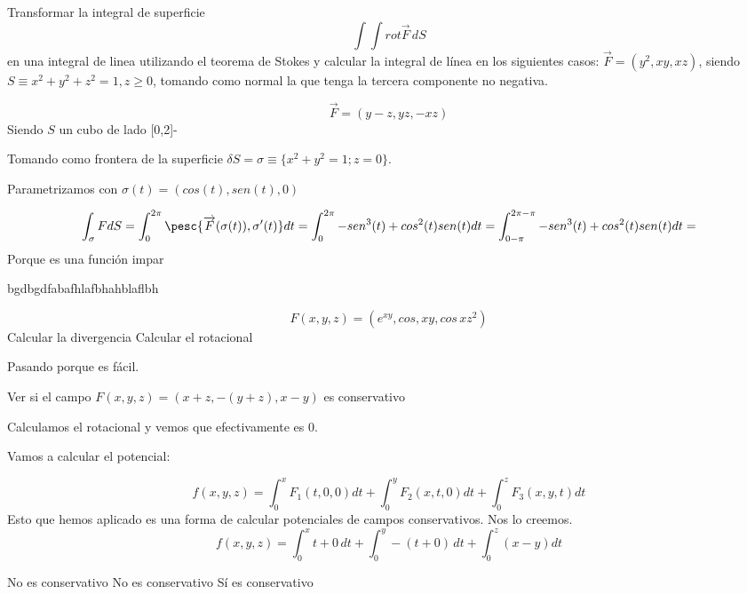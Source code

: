 \begin{problem}[20]
Transformar la integral de superficie \[\int\int rot\overrightarrow{F}\,dS\]
en una integral de linea utilizando el teorema de Stokes y calcular la integral de línea en los siguientes casos:
\ppart
$\overrightarrow{F} = (y^2,xy,xz)$, siendo $S \equiv x^2+y^2+z^2=1, z\geq 0$, tomando como normal la que tenga la tercera componente no negativa.

\ppart
 \[\overrightarrow{F} = (y-z,yz,-xz)\]
 Siendo $S$ un cubo de lado [0,2]-
\solution

\spart
Tomando como frontera de la superficie $\delta S = \sigma \equiv\{ x^2+y^2=1; z=0\}$.

Parametrizamos con $\sigma(t) = (cos(t),sen(t),0)$

\[
\int_{\sigma} FdS = \int_0^{2\pi}
\pesc{ \overrightarrow{F}(\sigma(t)), \sigma'(t)} dt = \int_0^{2\pi} -sen^3(t) + cos^2(t)sen(t) dt = \int_{0-\pi}^{2\pi-\pi} -sen^3(t) + cos^2(t)sen(t) dt = 
\]
Porque es una función impar

\spart

bgdbgdfabafhlafbhahblaflbh

\end{problem}



\begin{problem}[18]
\[F(x,y,z) = \left(e^{xy},cos
,xy,cos\,xz^2\right)\]
\ppart Calcular la divergencia
\ppart Calcular el rotacional
\solution

Pasando porque es fácil.

\end{problem}

\begin{problem}[19]

\ppart Ver si el campo  $ F(x,y,z) = (x+z,-(y+z),x-y)$ es conservativo
\ppart 
\ppart
\ppart 

\solution

\spart Calculamos el rotacional y vemos que efectivamente es 0.

Vamos a calcular el potencial:

\[f(x,y,z) = \int_0^x F_1(t,0,0)dt + \int_0^y F_2(x,t,0)dt + \int_0^z F_3(x,y,t)dt \]
Esto que hemos aplicado es una forma de calcular potenciales de campos conservativos. Nos lo creemos.
\[f(x,y,z) = \int_0^x t+0 \,dt + \int_0^y -(t+0)\,dt + \int_0^z (x-y)dt\]

\spart No es conservativo
\spart No es conservativo
\spart Sí es conservativo

\end{problem}

